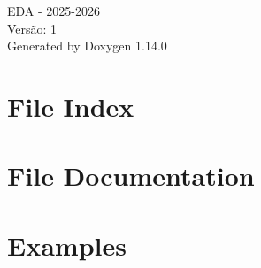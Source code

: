\documentclass[twoside]{book}
\newcommand{\+}{\discretionary{\mbox{\scriptsize$\hookleftarrow$}}{}{}}
\newcommand{\clearemptydoublepage}{%
    \newpage{\pagestyle{empty}\cleardoublepage}%
  }
\begin{document}
  \raggedbottom
    \hypersetup{pageanchor=false,
                bookmarksnumbered=true,
                pdfencoding=unicode
               }
  \begin{titlepage}
  \vspace*{7cm}
  \begin{center}%
  {\Large EDA -\/ 2025-\/2026}\\
  [1ex]\large Versão\+: 1 \\
  \vspace*{1cm}
  {\large Generated by Doxygen 1.14.0}\\
  \end{center}
  \end{titlepage}
  \clearemptydoublepage
  \tableofcontents
  \clearemptydoublepage
  \hypersetup{pageanchor=true}
\chapter{File Index}

\chapter{File Documentation}





\chapter{Examples}

  \backmatter
  \newpage
  \clearemptydoublepage
  \printindex
\end{document}
